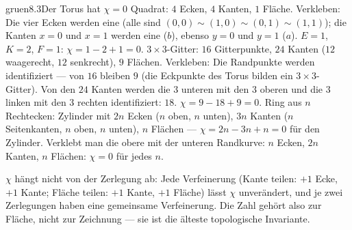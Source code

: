 \begin{loesungkarte}{gruen}{8.3}{Der Torus hat $\chi = 0$}
Quadrat: $4$ Ecken, $4$ Kanten, $1$ Fläche. Verkleben: Die vier Ecken werden eine (alle sind $(0, 0)\sim(1, 0)\sim(0, 1)\sim(1, 1)$); die Kanten $x = 0$ und $x = 1$ werden eine ($b$), ebenso $y = 0$ und $y = 1$ ($a$). $E = 1$, $K = 2$, $F = 1$: $\chi = 1 - 2 + 1 = 0$.
$3\times3$-Gitter: $16$ Gitterpunkte, $24$ Kanten ($12$ waagerecht, $12$ senkrecht), $9$ Flächen. Verkleben: Die Randpunkte werden identifiziert --- von $16$ bleiben $9$ (die Eckpunkte des Torus bilden ein $3\times3$-Gitter). Von den $24$ Kanten werden die $3$ unteren mit den $3$ oberen und die $3$ linken mit den $3$ rechten identifiziert: $18$. $\chi = 9 - 18 + 9 = 0$. \checkmark
{}
Ring aus $n$ Rechtecken: Zylinder mit $2n$ Ecken ($n$ oben, $n$ unten), $3n$ Kanten ($n$ Seitenkanten, $n$ oben, $n$ unten), $n$ Flächen --- $\chi = 2n - 3n + n = 0$ für den Zylinder. Verklebt man die obere mit der unteren Randkurve: $n$ Ecken, $2n$ Kanten, $n$ Flächen: $\chi = 0$ für jedes $n$. \checkmark
{}
\begin{mitnehmen}\kastentext
$\chi$ hängt nicht von der Zerlegung ab: Jede Verfeinerung (Kante teilen: $+1$ Ecke, $+1$ Kante; Fläche teilen: $+1$ Kante, $+1$ Fläche) lässt $\chi$ unverändert, und je zwei Zerlegungen haben eine gemeinsame Verfeinerung. Die Zahl gehört also zur Fläche, nicht zur Zeichnung --- sie ist die älteste topologische Invariante.
\end{mitnehmen}
\end{loesungkarte}

